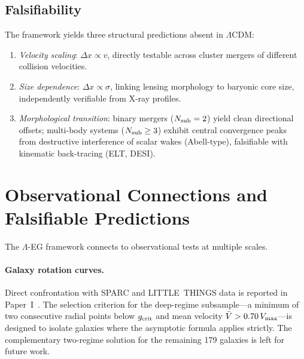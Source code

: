 \documentclass[11pt,a4paper]{article}
\begin{document}
\subsection{Falsifiability}
\label{subsec:lensing_falsifiability}

The framework yields three structural predictions absent in $\Lambda$CDM:
\begin{enumerate}[label=(\roman*)]
\item \textit{Velocity scaling}: $\Delta x\propto v$, directly testable across
      cluster mergers of different collision velocities.
\item \textit{Size dependence}: $\Delta x\propto\sigma$, linking lensing morphology
      to baryonic core size, independently verifiable from X-ray profiles.
\item \textit{Morphological transition}: binary mergers ($N_{\rm sub}=2$) yield
      clean directional offsets; multi-body systems ($N_{\rm sub}\geq3$) exhibit central
      convergence peaks from destructive interference of scalar wakes (Abell-type),
      falsifiable with kinematic back-tracing (ELT, DESI).
\end{enumerate}

\section{Observational Connections and Falsifiable Predictions}
\label{sec:obs}

The $\Lambda$-EG framework connects to observational tests at multiple scales.

\paragraph{Galaxy rotation curves.}
Direct confrontation with SPARC and LITTLE~THINGS data is reported in Paper~I~\cite{PaperI}.
The selection criterion for the deep-regime subsample---a minimum of two consecutive
radial points below $g_{\rm crit}$ and mean velocity $\bar{V} > 0.70\,V_{\rm max}$---is
designed to isolate galaxies where the asymptotic formula applies strictly.
The complementary two-regime solution for the remaining 179 galaxies is left for future work.
\end{document}
